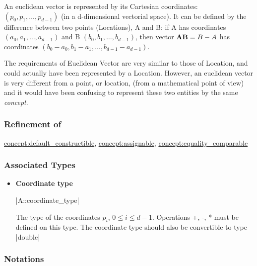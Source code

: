 \documentclass[12pt,twoside]{report}
\begin{document}
An euclidean vector is represented by its Cartesian coordinates: \mbox{$(p_0,p_1,\ldots,p_{d-1})$} (in a d-dimensional vectorial space).  
It can be defined by the difference between two points (Locations), A and B:
if A has coordinates  \mbox{$(a_0,a_1,\ldots,a_{d-1})$} and B \mbox{$(b_0,b_1,\ldots,b_{d-1})$}, then vector ${\bf AB}=B-A$ has coordinates \mbox{$(b_0-a_0, b_1-a_1,\ldots,b_{d-1}-a_{d-1})$}.

The requirements of Euclidean Vector are very similar to those of Location, and could actually have been represented by a Location. However, an euclidean vector is very different from a point, or location, (from a mathematical point of view) and it would have been confusing to represent these two entities by the same \emph{concept}.



\htmlrule[CLEAR=all]  \subsubsection*{Refinement of}

\hyperref{Default Constructible}{Default Constructible (see Section}{)}{concept:default_constructible}, \hyperref{Assignable}{Assignable (see Section}{)}{concept:assignable}, \hyperref{Equality Comparable}{Equality Comparable (see Section}{)}{concept:equality_comparable}



\htmlrule[CLEAR=all]  \subsubsection*{Associated Types}

\begin{itemize}
\item {\bf Coordinate type}

  |A::coordinate_type|

  The type of the coordinates $p_i$, \mbox{$0 \le i \le d-1$}. Operations +, -, * must be defined on this type. The coordinate type should also be convertible to type |double|

\end{itemize}




\htmlrule[CLEAR=all]  \subsubsection*{Notations}
\end{document}
